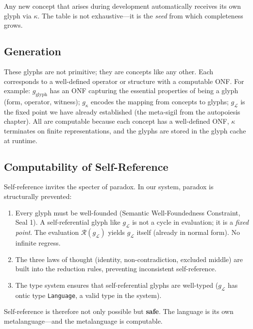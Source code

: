 \documentclass[12pt, letterpaper]{book}
\def\mathfrak#1{#1}%
\begin{document}
Any new concept that arises during development automatically receives its own glyph via $\kappa$. The table is not exhaustive---it is the \textit{seed} from which completeness grows.

\subsection{Generation}

These glyphs are not primitive; they are concepts like any other. Each corresponds to a well-defined operator or structure with a computable ONF. For example: $\mathfrak{g}_{\mathrm{glyph}}$ has an ONF capturing the essential properties of being a glyph (form, operator, witness); $\mathfrak{g}_\kappa$ encodes the mapping from concepts to glyphs; $\mathfrak{g}_\mathcal{L}$ is the fixed point we have already established (the meta-sigil from the autopoiesis chapter). All are computable because each concept has a well-defined ONF, $\kappa$ terminates on finite representations, and the glyphs are stored in the glyph cache at runtime.

\subsection{Computability of Self-Reference}

Self-reference invites the specter of paradox. In our system, paradox is structurally prevented:

\begin{enumerate}[label=(\roman*)]
    \item Every glyph must be well-founded (Semantic Well-Foundedness Constraint, Seal 1). A self-referential glyph like $\mathfrak{g}_\mathcal{L}$ is not a cycle in evaluation; it is a \textit{fixed point}. The evaluation $\mathcal{R}(\mathfrak{g}_\mathcal{L})$ yields $\mathfrak{g}_\mathcal{L}$ itself (already in normal form). No infinite regress.
    \item The three laws of thought (identity, non-contradiction, excluded middle) are built into the reduction rules, preventing inconsistent self-reference.
    \item The type system ensures that self-referential glyphs are well-typed ($\mathfrak{g}_\mathcal{L}$ has ontic type \texttt{Language}, a valid type in the system).
\end{enumerate}

Self-reference is therefore not only possible but \textbf{safe}. The language is its own metalanguage---and the metalanguage is computable.
\end{document}
